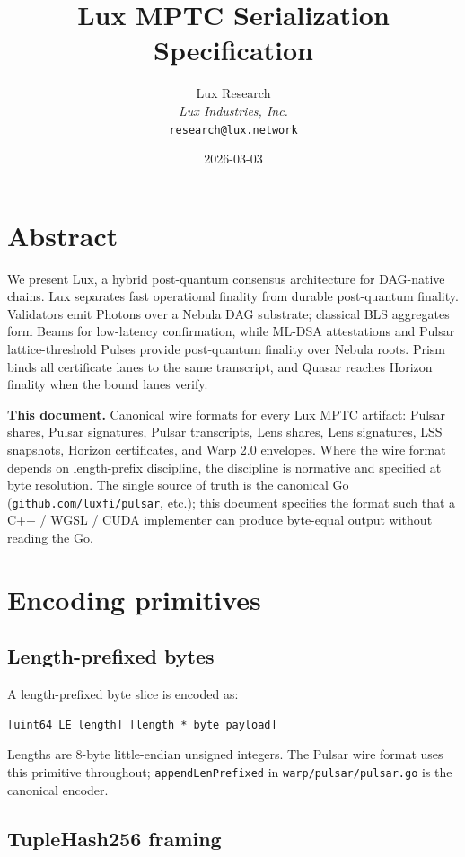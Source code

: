 \documentclass[11pt,a4paper]{article}
\title{Lux MPTC Serialization Specification}
\author{
Lux Research\\
\textit{Lux Industries, Inc.}\\
\texttt{research@lux.network}
}
\date{2026-03-03}
\begin{document}
\luxcoverpage

\section*{Abstract}

\noindent We present Lux, a hybrid post-quantum consensus architecture for DAG-native chains. Lux separates fast operational finality from durable post-quantum finality. Validators emit Photons over a Nebula DAG substrate; classical BLS aggregates form Beams for low-latency confirmation, while ML-DSA attestations and Pulsar lattice-threshold Pulses provide post-quantum finality over Nebula roots. Prism binds all certificate lanes to the same transcript, and Quasar reaches Horizon finality when the bound lanes verify.

\textbf{This document.} Canonical wire formats for every Lux MPTC artifact: Pulsar shares, Pulsar signatures, Pulsar transcripts, Lens shares, Lens signatures, LSS snapshots, Horizon certificates, and Warp 2.0 envelopes. Where the wire format depends on length-prefix discipline, the discipline is normative and specified at byte resolution. The single source of truth is the canonical Go (\texttt{github.com/luxfi/pulsar}, etc.); this document specifies the format such that a C++ / WGSL / CUDA implementer can produce byte-equal output without reading the Go.

\section{Encoding primitives}

\subsection{Length-prefixed bytes}

A length-prefixed byte slice is encoded as:

\begin{lstlisting}
[uint64 LE length] [length * byte payload]
\end{lstlisting}

Lengths are 8-byte little-endian unsigned integers. The Pulsar wire format uses this primitive throughout; \texttt{appendLenPrefixed} in \texttt{warp/pulsar/pulsar.go} is the canonical encoder.

\subsection{TupleHash256 framing}
\end{document}
